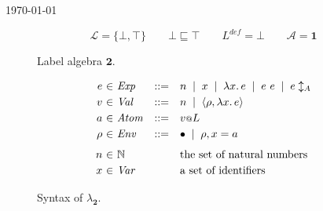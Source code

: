 \documentclass{article}
\makeatletter
\newcommand{\at}{\ensuremath{{\scriptstyle{@}}}}
\theoremstyle{definition}
\makeatother
\begin{document}
\begin{flushright}
  \today
\end{flushright}

\begin{figure}[h]
  \centering
  \[
  \mathcal{L} = \{ \bot, \top \}
  \qquad
  \bot \sqsubseteq \top
  \qquad
  L^{\mathit{def}} = \bot
  \qquad
  \mathcal{A} = \mathbf{1}
  \]
  \caption{Label algebra $\mathbf{2}$.}
  \label{fig:two}
\end{figure}

\begin{figure}[h]
  \centering
  \[
  \begin{array}[t]{r @{\ } c @{\ } l c l}
    e & \in & \mathit{Exp} & ::= &
    n\;\; |\;\;
    x\;\; |\;\;
    \lambda{x}.\, e\;\; |\;\;
    e\ e\;\; |\;\;
    e \updownarrow_{A} %
    \\[0.6ex]
    v & \in & \mathit{Val} & ::= &
    n\;\; |\;\;
    \langle{\rho, \lambda{x}.\, e\rangle}
    \\[0.6ex]
    a & \in & \mathit{Atom} & ::= &
    v \at L
    \\[0.6ex]
    \rho & \in & \mathit{Env} & ::= &
    \bullet\;\; |\;\;
    \rho, x = a
    \\[1.6ex]
    n & \in & \mathbb{N} & &
    \text{the set of natural numbers}
    \\[0.6ex]
    x & \in & \mathit{Var} & &
    \text{a set of identifiers}
  \end{array}
  \]
  \caption{Syntax of $\lambda_{\mathbf{2}}$.}
  \label{fig:syntax}
\end{figure}
\end{document}
